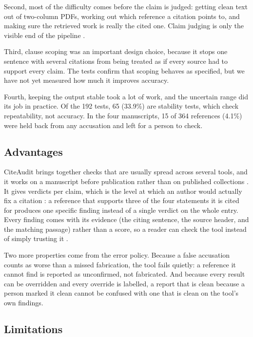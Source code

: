\documentclass{article}
\begin{document}
Second, most of the difficulty comes before the claim is judged: getting clean text out of two-column PDFs, working out which reference a citation points to, and making sure the retrieved work is really the cited one. Claim judging is only the visible end of the pipeline \cite{thorne2018,wadden2020}.

Third, clause scoping was an important design choice, because it stops one sentence with several citations from being treated as if every source had to support every claim. The tests confirm that scoping behaves as specified, but we have not yet measured how much it improves accuracy.

Fourth, keeping the output stable took a lot of work, and the uncertain range did its job in practice. Of the 192 tests, 65 (33.9\%) are stability tests, which check repeatability, not accuracy. In the four manuscripts, 15 of 364 references (4.1\%) were held back from any accusation and left for a person to check.

\subsection{Advantages}

CiteAudit brings together checks that are usually spread across several tools, and it works on a manuscript before publication rather than on published collections \cite{nicholson2021,peroni2020}. It gives verdicts per claim, which is the level at which an author would actually fix a citation \cite{ref2}: a reference that supports three of the four statements it is cited for produces one specific finding instead of a single verdict on the whole entry. Every finding comes with its evidence (the citing sentence, the source header, and the matching passage) rather than a score, so a reader can check the tool instead of simply trusting it \cite{hicks2015}.

Two more properties come from the error policy. Because a false accusation counts as worse than a missed fabrication, the tool fails quietly: a reference it cannot find is reported as unconfirmed, not fabricated. And because every result can be overridden and every override is labelled, a report that is clean because a person marked it clean cannot be confused with one that is clean on the tool's own findings.

\subsection{Limitations}
\end{document}

